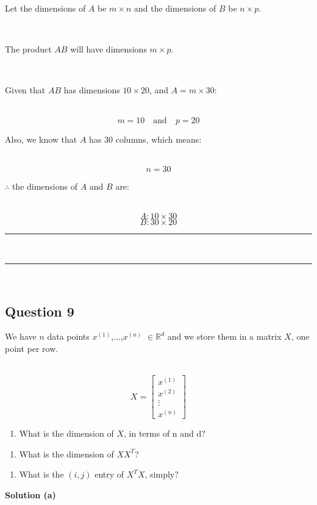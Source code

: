 \documentclass{article}
\begin{document}
\parbox{\textwidth}{Let the dimensions of $A$ be $m \times n$ and the dimensions of $B$ be $n \times p$.}\\

\parbox{\textwidth}{The product $AB$ will have dimensions $m \times p$.}\\

\parbox{\textwidth}{Given that $AB$ has dimensions $10 \times 20$, and $A = m \times 30$:}\\
$$m = 10 \quad \text{and} \quad p = 20$$
\parbox{\textwidth}{Also, we know that $A$ has $30$ columns, which means:}\\
$$n = 30$$
\parbox{\textwidth}{$\therefore$ the dimensions of $A$ and $B$ are:}\\
$$A: 10 \times 30$$
$$B: 30 \times 20$$

\noindent\rule{\textwidth}{0.4pt}\\
\noindent\rule{\textwidth}{0.4pt}\\

\newpage

\subsection*{Question 9}
\parbox{\textwidth}{We have $n$ data points $x^{(1)}$,...,$x^{(n)}$ $\in \mathbb{R}^d$ and we store them in a matrix $X$, one point per row.}\\
$$X = \begin{bmatrix}
x^{(1)} \\
x^{(2)} \\
\vdots \\
x^{(n)}
\end{bmatrix}$$

\begin{enumerate}[label=(a)]
    \item What is the dimension of $X$, in terms of n and d?
\end{enumerate}

\begin{enumerate}[label=(b)]
    \item What is the dimension of ${XX}^T$?
\end{enumerate}

\begin{enumerate}[label=(c)]
    \item What is the $(i,j)$ entry of  ${X}^TX$, simply?
\end{enumerate}

\parbox{\textwidth}{\textbf{Solution (a)}}
\end{document}
